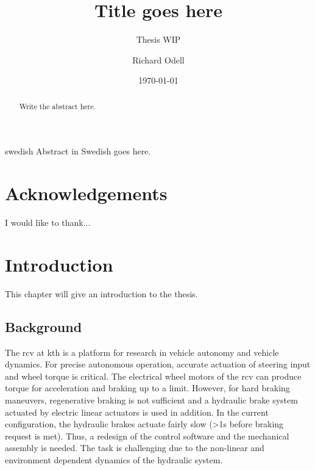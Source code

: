 \documentclass[a4paper,11pt]{kth-mag}
\title{Title goes here}
\subtitle{Thesis WIP}
\author{Richard Odell}
\date{\today}
\begin{document}
\frontmatter
\pagestyle{empty}
\removepagenumbers
\maketitle
{}


\clearpage
\begin{abstract}

Write the abstract here.

\end{abstract}
\clearpage
\begin{foreignabstract}{swedish}
Abstract in Swedish goes here.

\end{foreignabstract}
\clearpage

\chapter*{Acknowledgements}

I would like to thank...



\glsaddall
\printglossary
\renewcommand{\glsnamefont}[1]{\textbf{#1}}
\printglossary[type=\acronymtype,style=super,nonumberlist,nopostdot,nogroupskip]


\clearpage
\clearpage
\tableofcontents*
\clearpage
\listoffigures*
\clearpage
\listoftables*
\glsaddall



\mainmatter
\pagestyle{newchap}


\chapter{Introduction}

This chapter will give an introduction to the thesis. 

\section{Background}
The \gls{rcv} at \gls{kth} is a platform for research in vehicle autonomy and vehicle dynamics. For precise autonomous operation, accurate actuation of steering input and wheel torque is critical. The electrical wheel motors of the \gls{rcv} can produce torque for acceleration and braking up to a limit. However, for hard braking maneuvers, regenerative braking is not sufficient and a hydraulic brake system actuated by electric linear actuators is used in addition. In the current configuration, the hydraulic brakes actuate fairly slow (>1s before braking request is met). Thus, a redesign of the control software and the mechanical assembly is needed. The task is challenging due to the non-linear and environment dependent dynamics of the hydraulic system.
\end{document}

